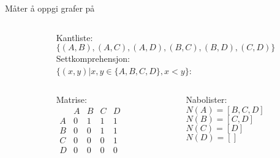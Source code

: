 \begin{frame}[fragile]{Måter å oppgi grafer på}
    \begin{columns}
        \begin{column}{0.3\textwidth}
        \end{column}
        \begin{column}{0.65\textwidth}
            Kantliste:\\
            $\{(A, B), (A, C), (A, D), (B, C), (B, D), (C, D)\}$\\[5mm]
            Settkomprehensjon:\\
            $\{(x, y) | x, y \in \{A,B,C,D\}, x < y\}$:\\[5mm]
            \begin{columns}
                \begin{column}{0.27\textwidth}
                    Matrise:\\
                    \begin{math}
                        \begin{matrix}
                              & A & B & C & D\\
                            A & 0 & 1 & 1 & 1\\
                            B & 0 & 0 & 1 & 1\\
                            C & 0 & 0 & 0 & 1\\
                            D & 0 & 0 & 0 & 0
                        \end{matrix}
                    \end{math}
                \end{column}
                \begin{column}{0.38\textwidth}
                    Nabolister:\\        
                    $N(A) = [B, C, D]$\\
                    $N(B) = [C, D]$\\
                    $N(C) = [D]$\\
                    $N(D) = []$
                \end{column} 
            \end{columns}
        \end{column}
    \end{columns}
\end{frame}